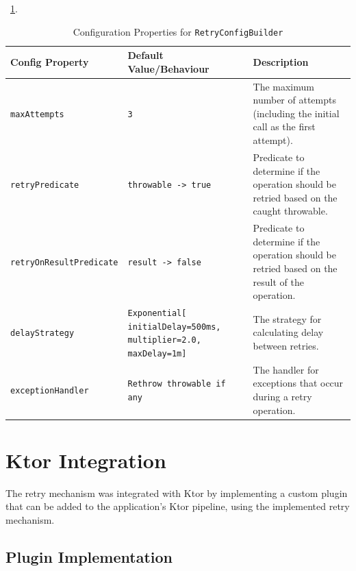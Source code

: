 ~\ref{tab:retry-config-builder}.

\begin{table}[!htb]
    \centering
    \caption{Configuration Properties for \texttt{RetryConfigBuilder}}
    \label{tab:retry-config-builder}
    \vspace{0.3cm}
    \begin{tabular}{|l|p{5cm}|p{6cm}|}
        \hline
        \textbf{Config Property} & \textbf{Default Value/Behaviour} & \textbf{Description} \\ \hline
        \texttt{maxAttempts} & \texttt{3} & The maximum number of attempts
        (including the initial call as the first attempt). \\ \hline
        \texttt{retryPredicate} & \texttt{throwable ->
            true} & Predicate
        to determine if the operation should be retried based on the caught throwable. \\ \hline
        \texttt{retryOnResultPredicate} & \texttt{result ->
            false} & Predicate
        to determine if the operation should be retried based on the result of the operation. \\ \hline
        \texttt{delayStrategy} & \texttt{Exponential[ initialDelay=500ms, multiplier=2.0, maxDelay=1m]}          & The strategy
        for calculating delay between retries.                                             \\ \hline
        \texttt{exceptionHandler} & \texttt{Rethrow throwable
        if any} & The handler for exceptions that occur during a retry operation. \\ \hline
    \end{tabular}
\end{table}


\resilienceMechanismDefaultConfig


\section{Ktor Integration}\label{sec:retry-ktor-integration}

The retry mechanism was integrated with Ktor
by implementing a custom plugin that can be added to the application's Ktor pipeline,
using the implemented retry mechanism.

\subsection{Plugin Implementation}\label{subsec:request-retry-plugin}

